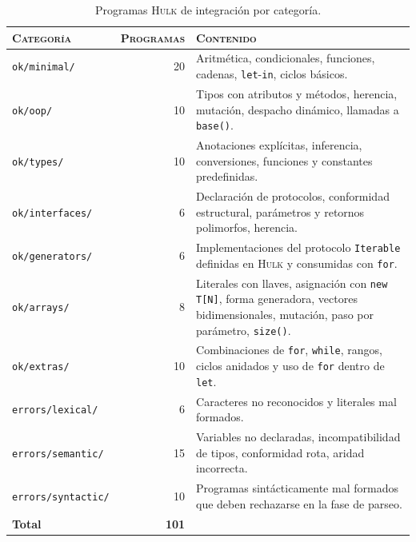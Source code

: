 \documentclass[11pt,a4paper,oneside,openany]{report}
\newcommand{\hulk}{\textsc{Hulk}}
\newcommand{\code}[1]{\texttt{#1}}
\begin{document}
\begin{table}[H]
\centering
\caption{Programas \hulk{} de integración por categoría.}
\label{tab:pruebas-int}
\begin{tabularx}{\textwidth}{lrX}
\toprule
\textsc{Categoría} & \textsc{Programas} & \textsc{Contenido} \\
\midrule
\code{ok/minimal/}    & 20 & Aritmética, condicionales, funciones, cadenas,
                              \code{let}-\code{in}, ciclos básicos. \\
\code{ok/oop/}        & 10 & Tipos con atributos y métodos, herencia, mutación,
                              despacho dinámico, llamadas a \code{base()}. \\
\code{ok/types/}      & 10 & Anotaciones explícitas, inferencia, conversiones,
                              funciones y constantes predefinidas. \\
\code{ok/interfaces/} &  6 & Declaración de protocolos, conformidad estructural,
                              parámetros y retornos polimorfos, herencia. \\
\code{ok/generators/} &  6 & Implementaciones del protocolo \code{Iterable}
                              definidas en \hulk{} y consumidas con \code{for}. \\
\code{ok/arrays/}     &  8 & Literales con llaves, asignación con \code{new T[N]},
                              forma generadora, vectores bidimensionales,
                              mutación, paso por parámetro, \code{size()}. \\
\code{ok/extras/}     & 10 & Combinaciones de \code{for}, \code{while}, rangos,
                              ciclos anidados y uso de \code{for} dentro de
                              \code{let}. \\
\midrule
\code{errors/lexical/}   &  6 & Caracteres no reconocidos y literales mal
                                formados. \\
\code{errors/semantic/}  & 15 & Variables no declaradas, incompatibilidad de
                                tipos, conformidad rota, aridad incorrecta. \\
\code{errors/syntactic/} & 10 & Programas sintácticamente mal formados que
                                deben rechazarse en la fase de parseo. \\
\midrule
\textbf{Total} & \textbf{101} & \\
\bottomrule
\end{tabularx}
\end{table}
\end{document}

